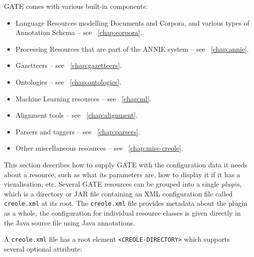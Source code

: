 GATE comes with various built-in components:
%
\begin{itemize}
%
\item
Language Resources modelling Documents and Corpora, and various types of
Annotation Schema -- see \Chapthing\ \ref{chap:corpora}.
%
\item
Processing Resources that are part of the ANNIE system -- see \Chapthing\
\ref{chap:annie}.
%
%
\item 
Gazetteers -- see \Chapthing\
\ref{chap:gazetteers}.
\item
Ontologies -- see \Chapthing\
\ref{chap:ontologies}.
\item
Machine Learning resources -- see \Chapthing\
\ref{chap:ml}.
\item
Alignment tools -- see \Chapthing\
\ref{chap:alignment}.
\item
Parsers and taggers -- see \Chapthing\
\ref{chap:parsers}.
\item
Other miscellaneous resources -- see \Chapthing\ \ref{chap:misc-creole}.
\end{itemize}


This section describes how to supply GATE with the configuration data it needs
about a resource, such as what its parameters are, how to display it if it has
a visualisation, etc.  Several GATE resources can be grouped into a single
\emph{plugin}, which is a directory or JAR file containing an XML configuration file called
{\tt creole.xml} at its root.  The {\tt creole.xml} file provides metadata
about the plugin as a whole, the configuration for individual resource classes
is given directly in the Java source file using Java annotations.

A {\tt creole.xml} file has a root element \verb|<CREOLE-DIRECTORY>| which
supports several optional attribute:

